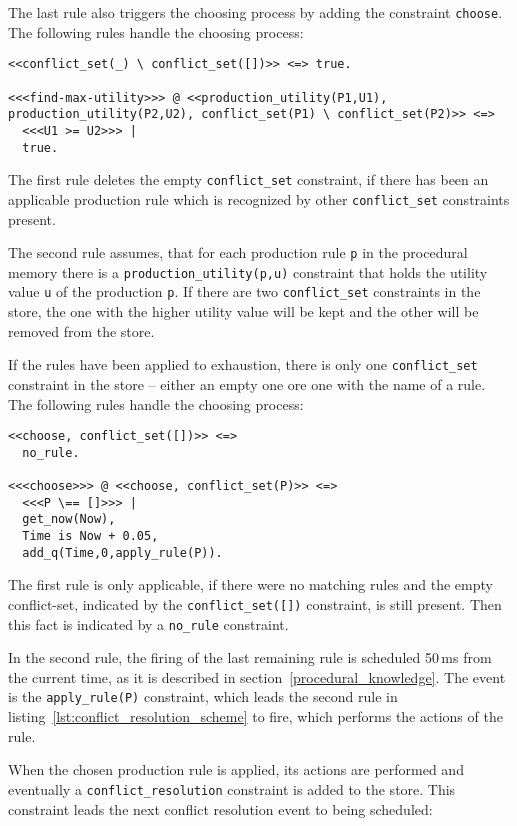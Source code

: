 The last rule also triggers the choosing process by adding the constraint \lstinline|choose|. The following rules handle the choosing process:

\begin{lstlisting}
<<conflict_set(_) \ conflict_set([])>> <=> true.
  
<<<find-max-utility>>> @ <<production_utility(P1,U1), production_utility(P2,U2), conflict_set(P1) \ conflict_set(P2)>> <=>
  <<<U1 >= U2>>> |
  true.
\end{lstlisting}

The first rule deletes the empty \lstinline|conflict_set| constraint, if there has been an applicable production rule which is recognized by other \lstinline|conflict_set| constraints present. 

The second rule assumes, that for each production rule \lstinline|p| in the procedural memory there is a \lstinline|production_utility(p,u)| constraint that holds the utility value \lstinline|u| of the production \lstinline|p|. If there are two \lstinline|conflict_set| constraints in the store, the one with the higher utility value will be kept and the other will be removed from the store.

If the rules have been applied to exhaustion, there is only one \lstinline|conflict_set| constraint in the store -- either an empty one ore one with the name of a rule. The following rules handle the choosing process:

\begin{lstlisting}
<<choose, conflict_set([])>> <=>
  no_rule.

<<<choose>>> @ <<choose, conflict_set(P)>> <=>
  <<<P \== []>>> |
  get_now(Now),
  Time is Now + 0.05,
  add_q(Time,0,apply_rule(P)). 
\end{lstlisting}

The first rule is only applicable, if there were no matching rules and the empty conflict-set, indicated by the \lstinline|conflict_set([])| constraint, is still present. Then this fact is indicated by a \lstinline|no_rule| constraint.

In the second rule, the firing of the last remaining rule is scheduled 50\,ms from the current time, as it is described in section~\ref{procedural_knowledge}. The event is the \lstinline|apply_rule(P)| constraint, which leads the second rule in listing~\ref{lst:conflict_resolution_scheme} to fire, which performs the actions of the rule.

When the chosen production rule is applied, its actions are performed and eventually a \lstinline|conflict_resolution| constraint is added to the store. This constraint leads the next conflict resolution event to being scheduled:

